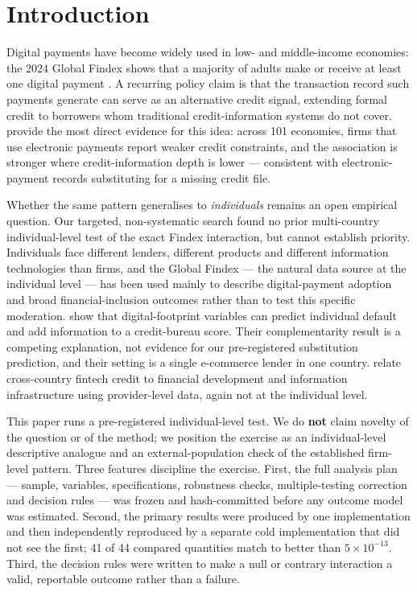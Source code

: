 \begin{abstract}
\medskip
\noindent\textbf{Keywords:} digital payments, financial inclusion, formal borrowing, credit
information, Global Findex, pre-registration. \quad\textbf{JEL:} G21, G51, O16, D14.
\end{abstract}

\section{Introduction}

Digital payments have become widely used in low- and middle-income economies: the 2024
Global Findex shows that a majority of adults make or receive at least one digital payment
\citep{KlapperSingerStaritaNorris2025}. A recurring policy claim is that the transaction
record such payments generate can serve as an alternative credit signal, extending formal
credit to borrowers whom traditional credit-information systems do not cover.
\citet{GalileaFaraziMare2026} provide the most direct evidence for this idea: across 101
economies, firms that use electronic payments report weaker credit constraints, and the
association is stronger where credit-information depth is lower --- consistent with
electronic-payment records substituting for a missing credit file.

Whether the same pattern generalises to \emph{individuals} remains an open empirical
question. Our targeted, non-systematic search found no prior multi-country individual-level
test of the exact Findex interaction, but cannot establish priority. Individuals face
different lenders, different products and different information technologies than firms, and
the Global Findex --- the natural data source at the individual level --- has been used
mainly to describe digital-payment adoption and broad financial-inclusion outcomes rather
than to test this specific moderation. \citet{BergBurgGombovicPuri2020} show that
digital-footprint variables can predict individual default and add information to a
credit-bureau score. Their complementarity result is a competing explanation, not evidence
for our pre-registered substitution prediction, and their setting is a single e-commerce
lender in one country. \citet{BazarbashBeaton2020} relate cross-country fintech credit to
financial development and information infrastructure using provider-level data, again not at
the individual level.

This paper runs a pre-registered individual-level test. We do \textbf{not} claim novelty of
the question or of the method; we position the exercise as an individual-level descriptive
analogue and an external-population check of the established firm-level pattern. Three
features discipline the exercise. First, the full analysis plan --- sample, variables,
specifications, robustness checks, multiple-testing correction and decision rules --- was
frozen and hash-committed before any outcome model was estimated. Second, the primary
results were produced by one implementation and then independently reproduced by a separate
cold implementation that did not see the first; 41 of 44 compared quantities match to better
than $5\times10^{-13}$. Third, the decision rules were written to make a null or contrary
interaction a valid, reportable outcome rather than a failure.

